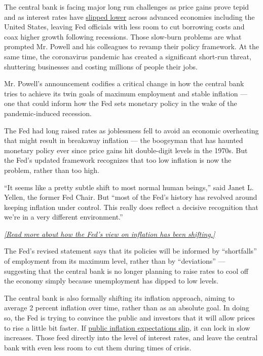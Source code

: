 The central bank is facing major long run challenges as price gains
prove tepid and as interest rates have
\href{https://www.nytimes3xbfgragh.onion/2020/02/29/business/economy/coronavirus-central-banks-economy.html}{slipped
lower} across advanced economies including the United States, leaving
Fed officials with less room to cut borrowing costs and coax higher
growth following recessions. Those slow-burn problems are what prompted
Mr. Powell and his colleagues to revamp their policy framework. At the
same time, the coronavirus pandemic has created a significant short-run
threat, shuttering businesses and costing millions of people their jobs.

Mr. Powell's announcement codifies a critical change in how the central
bank tries to achieve its twin goals of maximum employment and stable
inflation --- one that could inform how the Fed sets monetary policy in
the wake of the pandemic-induced recession.

The Fed had long raised rates as joblessness fell to avoid an economic
overheating that might result in breakaway inflation --- the boogeyman
that has haunted monetary policy ever since price gains hit double-digit
levels in the 1970s. But the Fed's updated framework recognizes that too
low inflation is now the problem, rather than too high.

``It seems like a pretty subtle shift to most normal human beings,''
said Janet L. Yellen, the former Fed Chair. But ``most of the Fed's
history has revolved around keeping inflation under control. This really
does reflect a decisive recognition that we're in a very different
environment.''

\href{https://www.nytimes3xbfgragh.onion/2019/11/01/business/economy/federal-reserve-inflation.html}{\emph{{[}Read
more about how the Fed's view on inflation has been shifting.{]}}}

The Fed's revised statement says that its policies will be informed by
``shortfalls'' of employment from its maximum level, rather than by
``deviations'' --- suggesting that the central bank is no longer
planning to raise rates to cool off the economy simply because
unemployment has dipped to low levels.

The central bank is also formally shifting its inflation approach,
aiming to average 2 percent inflation over time, rather than as an
absolute goal. In doing so, the Fed is trying to convince the public and
investors that it will allow prices to rise a little bit faster. If
\href{https://www.nytimes3xbfgragh.onion/2019/11/01/business/economy/federal-reserve-inflation.html}{public
inflation expectations slip}, it can lock in slow increases. Those feed
directly into the level of interest rates, and leave the central bank
with even less room to cut them during times of crisis.

